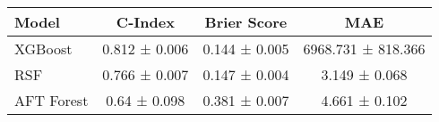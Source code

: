 \begin{tabular}{lccc}
\toprule
Model & C-Index & Brier Score & MAE \\
\midrule
XGBoost & 0.812 ± 0.006 & 0.144 ± 0.005 & 6968.731 ± 818.366 \\
RSF & 0.766 ± 0.007 & 0.147 ± 0.004 & 3.149 ± 0.068 \\
AFT Forest & 0.64 ± 0.098 & 0.381 ± 0.007 & 4.661 ± 0.102 \\
\bottomrule
\end{tabular}
